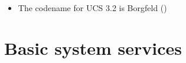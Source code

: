 \newcommand{\ucsUCRV}[1]{Univention Configuration Registry variable \ucsCommand{\ucsBCindex{#1}}}
\newcommand{\ucsCVE}[1]{\href{http://security-tracker.debian.org/tracker/CVE-#1}{CVE-#1}}

\begin{itemize}
\item The codename for UCS 3.2 is Borgfeld ()
\end{itemize}







\section{Basic system services}



